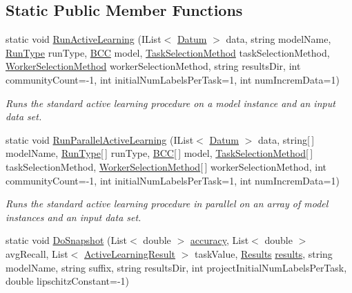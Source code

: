 \subsection*{Static Public Member Functions}
\begin{DoxyCompactItemize}
\item 
static void \hyperlink{class_crowdsourcing_models_1_1_active_learning_a8df4de56ff6f544dc7f8f86c2ad826f2}{Run\+Active\+Learning} (I\+List$<$ \hyperlink{class_crowdsourcing_models_1_1_datum}{Datum} $>$ data, string model\+Name, \hyperlink{namespace_crowdsourcing_models_ae187d0e1d9fe64e7ebcb9d948d02d2d0}{Run\+Type} run\+Type, \hyperlink{class_crowdsourcing_models_1_1_b_c_c}{B\+C\+C} model, \hyperlink{namespace_crowdsourcing_models_a1bb21d66b6c86daa36af97d919528356}{Task\+Selection\+Method} task\+Selection\+Method, \hyperlink{namespace_crowdsourcing_models_a1f0e849dc0691caa8fda0ce7778756a6}{Worker\+Selection\+Method} worker\+Selection\+Method, string results\+Dir, int community\+Count=-\/1, int initial\+Num\+Labels\+Per\+Task=1, int num\+Increm\+Data=1)
\begin{DoxyCompactList}\small\item\em Runs the standard active learning procedure on a model instance and an input data set. \end{DoxyCompactList}\item 
static void \hyperlink{class_crowdsourcing_models_1_1_active_learning_a5235db06f954b42ed1caca2e2efebe7b}{Run\+Parallel\+Active\+Learning} (I\+List$<$ \hyperlink{class_crowdsourcing_models_1_1_datum}{Datum} $>$ data, string\mbox{[}$\,$\mbox{]} model\+Name, \hyperlink{namespace_crowdsourcing_models_ae187d0e1d9fe64e7ebcb9d948d02d2d0}{Run\+Type}\mbox{[}$\,$\mbox{]} run\+Type, \hyperlink{class_crowdsourcing_models_1_1_b_c_c}{B\+C\+C}\mbox{[}$\,$\mbox{]} model, \hyperlink{namespace_crowdsourcing_models_a1bb21d66b6c86daa36af97d919528356}{Task\+Selection\+Method}\mbox{[}$\,$\mbox{]} task\+Selection\+Method, \hyperlink{namespace_crowdsourcing_models_a1f0e849dc0691caa8fda0ce7778756a6}{Worker\+Selection\+Method}\mbox{[}$\,$\mbox{]} worker\+Selection\+Method, int community\+Count=-\/1, int initial\+Num\+Labels\+Per\+Task=1, int num\+Increm\+Data=1)
\begin{DoxyCompactList}\small\item\em Runs the standard active learning procedure in parallel on an array of model instances and an input data set. \end{DoxyCompactList}\item 
static void \hyperlink{class_crowdsourcing_models_1_1_active_learning_aab85c3baf7e24604c852674e2c1c51e4}{Do\+Snapshot} (List$<$ double $>$ \hyperlink{class_crowdsourcing_models_1_1_active_learning_a1ccb8af29304a1b08074ff2bb44b9af6}{accuracy}, List$<$ double $>$ avg\+Recall, List$<$ \hyperlink{class_crowdsourcing_models_1_1_active_learning_result}{Active\+Learning\+Result} $>$ task\+Value, \hyperlink{class_crowdsourcing_models_1_1_results}{Results} \hyperlink{class_crowdsourcing_models_1_1_active_learning_a4f3abbe012947f48a2476130e2dd9d1e}{results}, string model\+Name, string suffix, string results\+Dir, int project\+Initial\+Num\+Labels\+Per\+Task, double lipschitz\+Constant=-\/1)

\end{DoxyCompactItemize}
